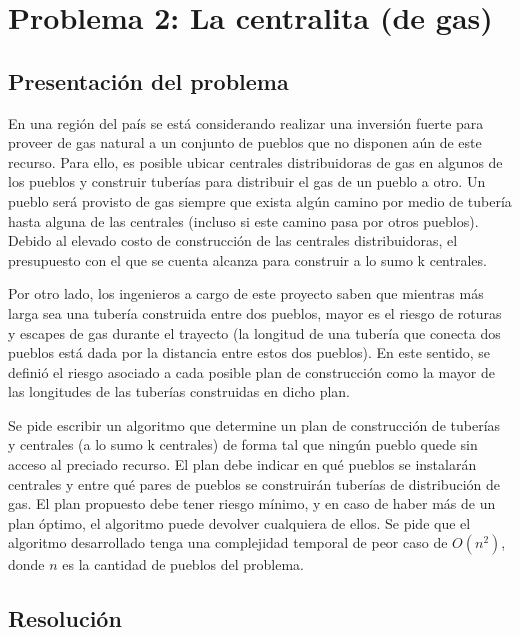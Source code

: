 \section{Problema 2: La centralita (de gas)}

\subsection{Presentaci\'on del problema}
En una regi\'on del pa\'is se est\'a considerando realizar una inversi\'on fuerte para proveer de gas natural
a un conjunto de pueblos que no disponen a\'un de este recurso. Para ello, es posible ubicar centrales
distribuidoras de gas en algunos de los pueblos y construir tuber\'ias para distribuir el gas de un pueblo a
otro. Un pueblo ser\'a provisto de gas siempre que exista alg\'un camino por medio de tuber\'ia hasta alguna
de las centrales (incluso si este camino pasa por otros pueblos). Debido al elevado costo de construcci\'on
de las centrales distribuidoras, el presupuesto con el que se cuenta alcanza para construir a lo sumo k
centrales.

Por otro lado, los ingenieros a cargo de este proyecto saben que mientras m\'as larga sea una tuber\'ia
construida entre dos pueblos, mayor es el riesgo de roturas y escapes de gas durante el trayecto (la
longitud de una tuber\'ia que conecta dos pueblos est\'a dada por la distancia entre estos dos pueblos).
En este sentido, se defini\'o el riesgo asociado a cada posible plan de construcci\'on como la mayor de las
longitudes de las tuber\'ias construidas en dicho plan.

Se pide escribir un algoritmo que determine un plan de construcci\'on de tuber\'ias y centrales (a lo sumo k
centrales) de forma tal que ning\'un pueblo quede sin acceso al preciado recurso. El plan debe indicar en
qu\'e pueblos se instalar\'an centrales y entre qu\'e pares de pueblos se construir\'an tuber\'ias de distribuci\'on de
gas. El plan propuesto debe tener riesgo m\'inimo, y en caso de haber m\'as de un plan \'optimo, el algoritmo
puede devolver cualquiera de ellos. Se pide que el algoritmo desarrollado tenga una complejidad temporal
de peor caso de $O(n^2)$, donde $n$ es la cantidad de pueblos del problema.

\subsection{Resoluci\'on}

